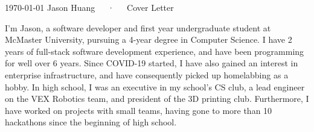 \documentclass[11pt, a4paper]{awesome-cv}
\begin{document}
\makecvheader[R]

\makecvfooter
  {\today}
  {Jason Huang~~~·~~~Cover Letter}
  {}

\makelettertitle

\begin{cvletter}

I'm Jason, a software developer and first year undergraduate student at McMaster University,
pursuing a 4-year degree in Computer Science.
I have 2 years of full-stack software development experience, 
and have been programming for well over 6 years.
Since COVID-19 started, I have also gained an interest in enterprise infrastructure,
and have consequently picked up homelabbing as a hobby.
In high school, I was an executive in my school's CS club,
a lead engineer on the VEX Robotics team,
and president of the 3D printing club.
Furthermore, I have worked on projects with small teams, 
having gone to more than 10 hackathons since the beginning of high school.


\end{cvletter}
\end{document}
